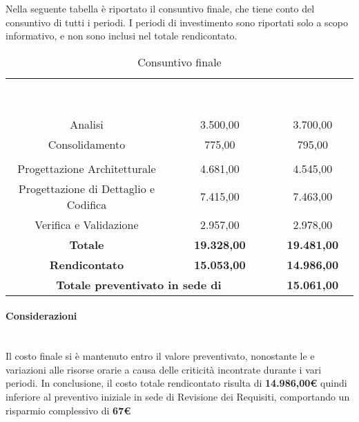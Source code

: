 Nella seguente tabella è riportato il consuntivo finale, che tiene conto del consuntivo di tutti i periodi. I periodi di investimento sono riportati solo a scopo informativo, e non sono inclusi nel totale rendicontato.

\begin{table}[H]
	\centering
	\begin{tabular}{ccc}
	\rowcolor{greySWEight}
	\textcolor{white}{\textbf{Periodo}} &
	\textcolor{white}{\textbf{Preventivo in Euro}} & 
	\textcolor{white}{\textbf{Costo in Euro}} \\
	Analisi & 3.500,00 & 3.700,00 \\
	Consolidamento & 775,00 & 795,00 \\
	\rowcolor{greySWEight}
	\multicolumn{3}{c}{ \textcolor{white}{\textbf{Rendicontato}} } \\
	Progettazione Architetturale & 4.681,00 & 4.545,00 \\
	Progettazione di Dettaglio e Codifica & 7.415,00 & 7.463,00 \\
	Verifica e Validazione & 2.957,00 & 2.978,00 \\
	\textbf{Totale} & \textbf{19.328,00} & \textbf{19.481,00} \\
	\textbf{Rendicontato} & \textbf{15.053,00} & \textbf{14.986,00} \\
	\multicolumn{2}{c}{\textbf{Totale preventivato in sede di \RR{}} } & \textbf{15.061,00} \\
	\end{tabular}
	\caption{Consuntivo finale}
\end{table}
\paragraph{Considerazioni}\mbox{}\\
Il costo finale si è mantenuto entro il valore preventivato, nonostante le e variazioni alle risorse orarie a causa delle criticità incontrate durante i vari periodi.
In conclusione, il costo totale rendicontato risulta di \textbf{14.986,00\euro{}} quindi inferiore al preventivo iniziale in sede di Revisione dei Requisiti, comportando un risparmio complessivo di \textbf{67\euro{}}
